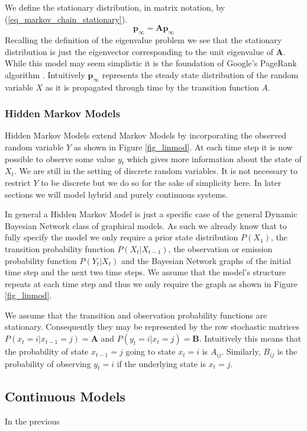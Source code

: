 \documentclass[../masters.tex]{subfiles}
\begin{document}
We define the stationary distribution, in matrix notation, by (\ref{eq_markov_chain_stationary}).
\begin{equation}
\mathbf{p}_{\infty} = \mathbf{A}\mathbf{p}_{\infty}
\label{eq_markov_chain_stationary}
\end{equation}
Recalling the definition of the eigenvalue problem we see that the stationary distribution is just the eigenvector corresponding to the unit eigenvalue of $\mathbf{A}$. While this model may seem simplistic it is the foundation of Google's PageRank algorithm \cite{google}.  Intuitively $\mathbf{p}_\infty$ represents the steady state distribution of the random variable $X$ as it is propagated through time by the transition function $A$.

\subsubsection{Hidden Markov Models}
Hidden Markov Models extend Markov Models by incorporating the observed random variable $Y$ as shown in Figure \ref{fig_linmod}. At each time step it is now possible to observe some value $y_t$ which gives more information about the state of $X_t$. We are still in the setting of discrete random variables. It is not necessary to restrict $Y$ to be discrete but we do so for the sake of simplicity here. In later sections we will model hybrid and purely continuous systems. 

In general a Hidden Markov Model is just a specific case of the general Dynamic Bayesian Network class of graphical models. As such we already know that to fully specify the model we only require a prior state distribution $P(X_1)$, the transition probability function $P(X_t|X_{t-1})$, the observation or emission probability function $P(Y_t|X_t)$ and the Bayesian Network graphs of the initial time step and the next two time steps. We assume that the model's structure repeats at each time step and thus we only require the graph as shown in Figure \ref{fig_linmod}. 

We assume that the transition and observation probability functions are stationary. Consequently they may be represented by the row stochastic matrices $P(x_t=i|x_{t-1}=j) = \mathbf{A}$ and $P(y_t=i|x_t=j) = \mathbf{B}$. Intuitively this means that the probability of state $x_{t-1}=j$ going to state $x_{t} = i$ is $A_{ij}$. Similarly, $B_{ij}$ is the probability of observing $y_t=i$ if the underlying state is $x_t=j$.

\subsection{Continuous Models}
In the previous



\end{document}
